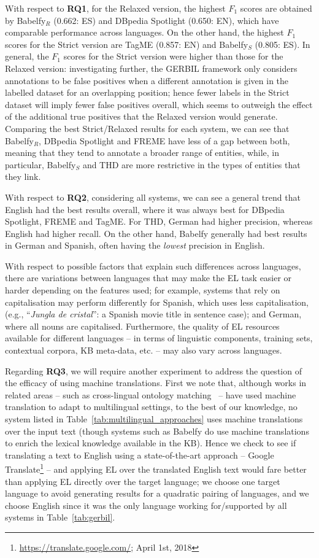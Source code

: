 \documentclass{llncs}
\begin{document}
With respect to \textbf{RQ1}, for the Relaxed version, the highest $F_1$ scores are obtained by Babelfy$_R$ (0.662: ES) and DBpedia Spotlight (0.650: EN), which have comparable performance across languages. On the other hand, the highest $F_1$ scores for the Strict version are TagME (0.857: EN) and Babelfy$_S$ (0.805: ES). In general, the $F_1$ scores for the Strict version were higher than those for the Relaxed version: investigating further, the GERBIL framework only considers annotations to be false positives when a different annotation is given in the labelled dataset for an overlapping position; hence fewer labels in the Strict dataset will imply fewer false positives overall, which seems to outweigh the effect of the additional true positives that the Relaxed version would generate. Comparing the best Strict/Relaxed results for each system, we can see that Babelfy$_R$, DBpedia Spotlight and FREME have less of a gap between both, meaning that they tend to annotate a broader range of entities, while, in particular, Babelfy$_S$ and THD are more restrictive in the types of entities that they link.

With respect to \textbf{RQ2}, considering all systems, we can see a general trend that English had the best results overall, where it was always best for DBpedia Spotlight, FREME and TagME. For THD, German had higher precision, whereas English had higher recall. On the other hand, Babelfy generally had best results in German and Spanish, often having the \textit{lowest} precision in English. 

With respect to possible factors that explain such differences across languages, there are variations between languages that may make the EL task easier or harder depending on the features used; for example, systems that rely on capitalisation may perform differently for Spanish, which uses less capitalisation, (e.g., ``\textit{Jungla de cristal}'': a Spanish movie title in sentence case); and German, where all nouns are capitalised. Furthermore, the quality of EL resources available for different languages -- in terms of linguistic components, training sets, contextual corpora, KB meta-data, etc. -- may also vary across languages.
\medskip

Regarding \textbf{RQ3}, we will require another experiment to address the question of the efficacy of using machine translations. First we note that, although works in related areas -- such as cross-lingual ontology matching~\cite{FuBO10} -- have used machine translation to adapt to multilingual settings, to the best of our knowledge, no system listed in Table~\ref{tab:multilingual_approaches} uses machine translations over the input text (though systems such as Babelfy do use machine translations to enrich the lexical knowledge available in the KB). Hence we check to see if translating a text to English using a state-of-the-art approach -- Google Translate\footnote{\url{https://translate.google.com/}; April 1st, 2018} -- and applying EL over the translated English text would fare better than applying EL directly over the target language; we choose one target language to avoid generating results for a quadratic pairing of languages, and we choose English since it was the only language working for/supported by all systems in Table~\ref{tab:gerbil}.
\end{document}
